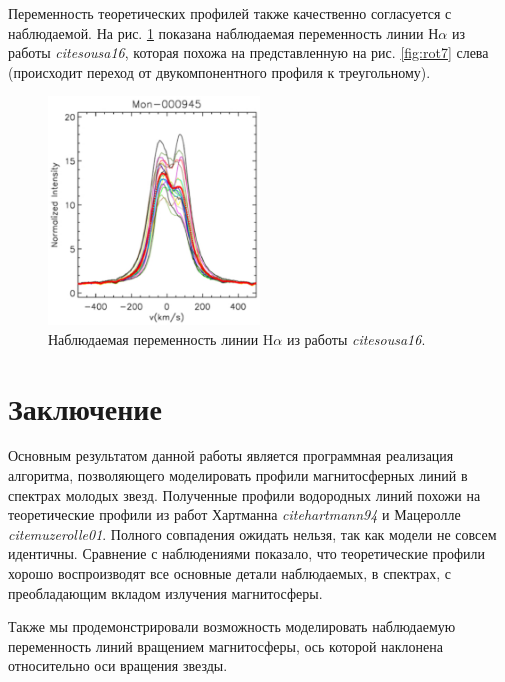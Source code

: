 \documentclass{article}
\begin{document}

Переменность теоретических профилей также качественно согласуется с наблюдаемой. На рис. \ref{fig:compvar} показана наблюдаемая переменность линии Н$\alpha$ из работы \textit{cite{sousa16}}, которая похожа на представленную на рис. \ref{fig:rot7} слева (происходит переход от двукомпонентного профиля к треугольному).

\begin{figure}[h]
\centering
\includegraphics[width=0.5\textwidth]{profilevar.eps}
\caption{Наблюдаемая переменность линии H$\alpha$ из работы \textit{cite{sousa16}}.}
\label{fig:compvar}
\end{figure} 


\section{Заключение}

Основным результатом данной работы является программная реализация алгоритма, позволяющего моделировать профили магнитосферных линий в спектрах молодых звезд.
Полученные профили водородных линий похожи на теоретические профили из работ Хартманна \textit{cite{hartmann94}} и Мацеролле \textit{cite{muzerolle01}}. Полного совпадения ожидать нельзя, так как модели не совсем идентичны. Сравнение с наблюдениями показало, что теоретические профили хорошо воспроизводят все основные детали наблюдаемых, в спектрах, с преобладающим вкладом излучения магнитосферы. 

Также мы продемонстрировали возможность моделировать наблюдаемую переменность линий вращением магнитосферы, ось которой наклонена относительно оси вращения звезды.
\end{document}
